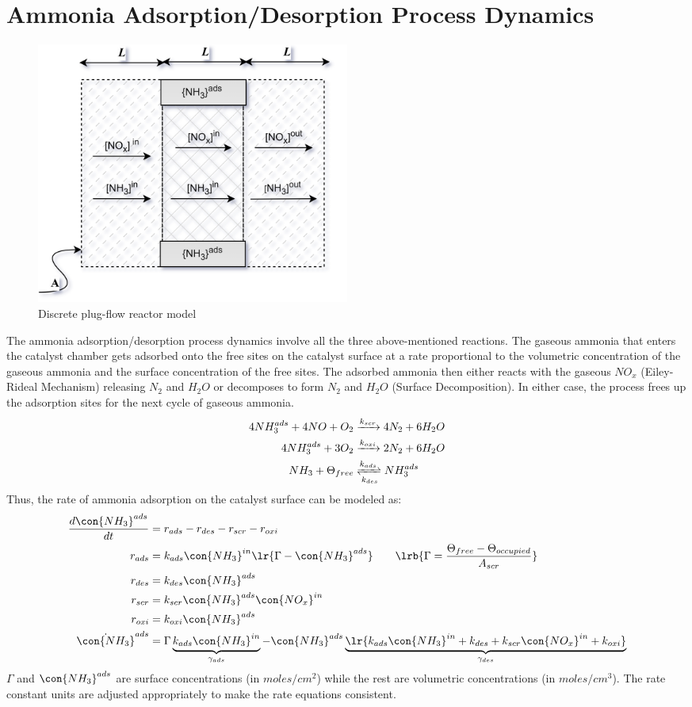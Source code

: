 \newpage
\section{Ammonia Adsorption/Desorption Process Dynamics}
\begin{figure}[H]
    \centering
    \includegraphics[width=0.5\textwidth]{Part3/figs/plug_flow_discrete.png}
    \caption{Discrete plug-flow reactor model}
    \label{fig:plug_flow_discrete}
\end{figure}
The ammonia adsorption/desorption process dynamics involve all the three above-mentioned reactions. The gaseous ammonia
that enters the catalyst chamber gets adsorbed onto the free sites on the catalyst surface at a rate proportional to the
volumetric concentration of the gaseous ammonia and the surface concentration of the free sites. The adsorbed ammonia
then either reacts with the gaseous $NO_x$ (Eiley-Rideal Mechanism) releasing $N_2$ and $H_2O$ or decomposes to form
$N_2$ and $H_2O$ (Surface Decomposition). In either case, the process frees up the adsorption sites for the next cycle
of gaseous ammonia.
\begin{align*}
    4 NH_3 ^{ads} + 4 NO + O_2 &\xrightarrow[]{k_{scr}} 4 N_2 + 6 H_2O \\
    4 NH_3^{ads} + 3 O_2 &\xrightarrow[]{k_{oxi}} 2 N_2 + 6 H_2O \\
    NH_3 + \Theta_{free} &\xrightleftharpoons[k_{des}]{k_{ads}} NH_3^{ads}
\end{align*}
Thus, the rate of ammonia adsorption on the catalyst surface can be modeled as:
\begin{align*}
    \frac{d \con{NH_3}^{ads}}{dt} &= r_{ads} - r_{des} - r_{scr} - r_{oxi}\\
    r_{ads} &= k_{ads} \con{NH_3}^{in} \lr{\Gamma - \con{NH_3}^{ads}} \qquad \lrb{\Gamma = \frac{\Theta_{free} - \Theta_{occupied}}{A_{scr}}}\\
    r_{des} &= k_{des} \con{NH_3}^{ads}\\
    r_{scr} &= k_{scr} \con{NH_3}^{ads} \con{NO_x}^{in}\\
    r_{oxi} &= k_{oxi} \con{NH_3}^{ads}\\
    \dot{\con{NH_3}}^{ads} &= \Gamma \underbrace{k_{ads} \con{NH_3}^{in}}_{\gamma_{ads}} - \con{NH_3}^{ads} \underbrace{\lr{k_{ads} \con{NH_3}^{in} + k_{des} + k_{scr} \con{NO_x}^{in} + k_{oxi}}}_{\gamma_{des}}
\end{align*}
 $\Gamma$ and $\con{NH_3}^{ads}$ are surface concentrations (in $moles/cm^2$) while the rest are volumetric
concentrations (in $moles/cm^3$). The rate constant units are adjusted appropriately to make the rate equations
consistent.

